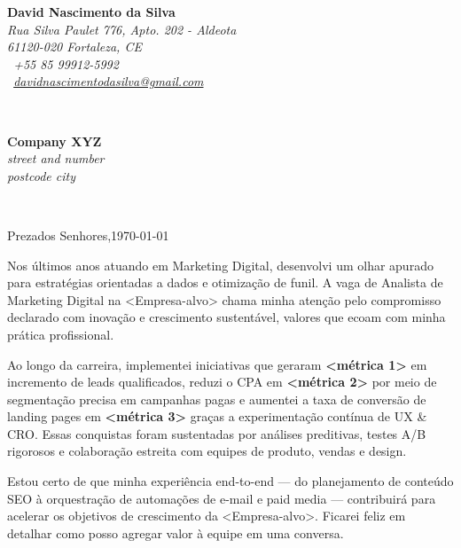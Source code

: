 \sffamily   %
\hfill%
\begin{minipage}[t]{.6\textwidth}
	\raggedleft%
	{\bfseries David Nascimento da Silva}\\[.35ex]
	\small\itshape%
	Rua Silva Paulet 776, Apto. 202 - Aldeota\\
	61120-020 Fortaleza, CE\\[.35ex]
	\Telefon~+55 85 99912-5992\\
	\Letter~\href{mailto:davidnascimentodasilva@gmail.com}{davidnascimentodasilva@gmail.com}
\end{minipage}\\[1em]
%
\begin{minipage}[t]{.4\textwidth}
	\raggedright%
	{\bfseries Company XYZ}\\[.35ex]
	\small\itshape%
	street and number\\
	postcode city
\end{minipage}
\hfill %
%
\begin{minipage}[t]{.4\textwidth}
\end{minipage}\\[2em]
\raggedright%
Prezados Senhores,\hfill \today\\[1.5em]

\setlength{\parskip}{1.0\baselineskip} %
\setlength{\parindent}{0pt} %

\vspace{1.5em} %
Nos últimos anos atuando em Marketing Digital, desenvolvi um olhar apurado para estratégias orientadas a dados e otimização de funil. A vaga de Analista de Marketing Digital na <Empresa-alvo> chama minha atenção pelo compromisso declarado com inovação e crescimento sustentável, valores que ecoam com minha prática profissional.

Ao longo da carreira, implementei iniciativas que geraram \textbf{<métrica 1>} em incremento de leads qualificados, reduzi o CPA em \textbf{<métrica 2>} por meio de segmentação precisa em campanhas pagas e aumentei a taxa de conversão de landing pages em \textbf{<métrica 3>} graças a experimentação contínua de UX & CRO. Essas conquistas foram sustentadas por análises preditivas, testes A/B rigorosos e colaboração estreita com equipes de produto, vendas e design.

Estou certo de que minha experiência end-to-end — do planejamento de conteúdo SEO à orquestração de automações de e-mail e paid media — contribuirá para acelerar os objetivos de crescimento da <Empresa-alvo>. Ficarei feliz em detalhar como posso agregar valor à equipe em uma conversa.

